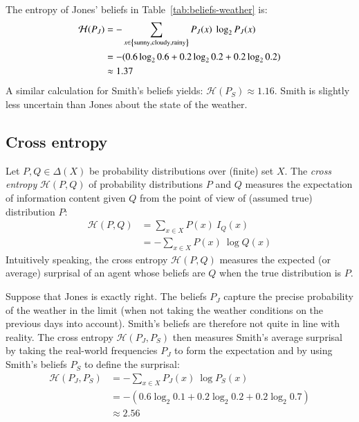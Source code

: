 \documentclass[nobib,nofonts]{tufte-handout}
\begin{document}
\begin{example}
  The entropy of Jones' beliefs in Table~\ref{tab:beliefs-weather} is:
  \begin{align*}
    \mathcal{H}(P_{J})
 & = - \sum_{x \in \left\{\text{sunny}, \text{cloudy}, \text{rainy}\right\}} P_{J}(x) \ \log_{2} P_{J}(x) \\
 & = - (0.6  \log_{2} 0.6
   +  0.2  \log_{2} 0.2
   +  0.2  \log_{2} 0.2) \\
 & \approx 1.37
  \end{align*}
  A similar calculation for Smith's beliefs yields: $\mathcal{H}(P_{S}) \approx 1.16$.
  Smith is slightly less uncertain than Jones about the state of the weather.
\end{example}

\subsection{Cross entropy}

Let $P, Q \in \Delta(X)$ be probability distributions over (finite) set $X$.
The \emph{cross entropy} $\mathcal{H}(P,Q)$ of probability distributions $P$ and $Q$ measures the expectation of information content given $Q$ from the point of view of (assumed true) distribution $P$:
\begin{align*}
  \mathcal{H}(P,Q) & = \sum_{x \in X} P(x) \ I_{Q}(x) \\
                   & = - \sum_{x \in X} P(x) \ \log Q(x)
\end{align*}
Intuitively speaking, the cross entropy $\mathcal{H}(P,Q)$ measures the expected (or average) surprisal of an agent whose beliefs are $Q$ when the true distribution is $P$.

\begin{example}
  Suppose that Jones is exactly right.
  The beliefs $P_{J}$ capture the precise probability of the weather in the limit (when not taking the weather conditions on the previous days into account).
  Smith's beliefs are therefore not quite in line with reality.
  The cross entropy $\mathcal{H}(P_{J}, P_{S})$ then measures Smith's average surprisal by taking the real-world frequencies $P_{J}$ to form the expectation and by using Smith's beliefs $P_{S}$ to define the surprisal:
  \begin{align*}
    \mathcal{H}(P_{J}, P_{S}) & = - \sum_{x \in X} P_{J}(x) \ \log P_{S}(x) \\
    & = -( 0.6 \log_{2} 0.1  +
    0.2 \log_{2} 0.2  +
      0.2 \log_{2} 0.7  ) \\
    & \approx 2.56
  \end{align*}
\end{example}
\end{document}
